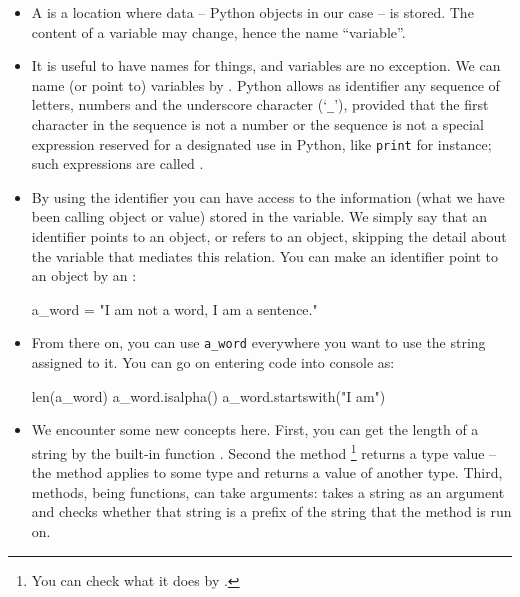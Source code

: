 \documentclass[a4paper]{article}
\begin{document}
\begin{itemize}

\item  A  is a location where data -- Python objects in our case
-- is stored. The content of a variable may change, hence the name ``variable''. 

\item It is useful to have names for things, and variables are no exception. We
can name (or point to) variables by . Python allows as
identifier any sequence of letters, numbers and the underscore character
(`\Verb+_+'), provided that the first character in the sequence is not a number
or the sequence is not a special expression reserved for a designated use in
Python, like \Verb+print+ for instance; such expressions are called
.  

\item By using the identifier you can have access to the information (what we
have been calling object or value) stored in the variable. We simply say that an
identifier points to an object, or refers to an object, skipping the detail
about the variable that mediates this relation.  You can make an identifier
point to an object by an :

\begin{ucodeframe}
\begin{pyconsole}
a_word = "I am not a word, I am a sentence."
\end{pyconsole}
\end{ucodeframe}

\item From there on, you can use \Verb+a_word+ everywhere you want to use the
string assigned to it. You can go on entering code into console as: 

\begin{ucodeframe}
\begin{pyconsole}
len(a_word)
a_word.isalpha()
a_word.startswith("I am")
\end{pyconsole}
\end{ucodeframe}

\item We encounter some new concepts here. First, you can get the length of
a string by the built-in function . Second the method
\footnote{You can check what it does by .} returns
a  type value -- the method applies to some type and returns a value of
another type. Third, methods, being functions, can take arguments:
 takes a string as an argument and checks whether that string is
a prefix of the string that the method is run on.
	



\end{itemize}
\end{document}

